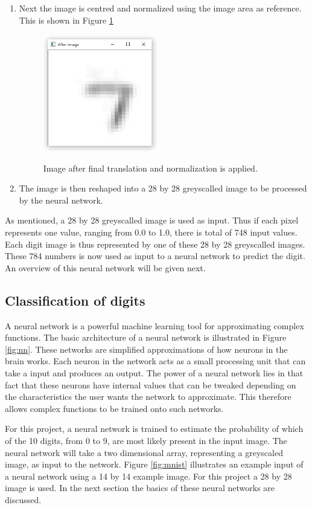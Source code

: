 \begin{enumerate}
\item Next the image is centred and normalized using the image area as reference.  This is shown in Figure \ref{fig:final}

\begin{figure}
  \centering
  \includegraphics[width=5cm]{TranslateAndScale}\\
  \caption{Image after final translation and normalization is applied.}
  \label{fig:final}
\end{figure}

\item The image is then reshaped into a 28 by 28 greyscalled image to be processed by the neural network.
\end{enumerate}
As mentioned, a 28 by 28 greyscalled image is used as input. Thus if each pixel represents one value, ranging from 0.0 to 1.0, there is total of 748 input values. Each digit image is thus represented by  one of these 28 by 28 greyscalled images. These 784 numbers is now used as input to a neural network to predict the digit. An overview of this neural network will be given next.

\subsection{Classification of digits}

A neural network is a powerful machine learning tool for approximating complex functions. The basic architecture of a neural network is illustrated in Figure \ref{fig:nn}. These networks are simplified approximations of how neurons in the brain works. Each neuron in the network acts as a small processing unit that can take a input and produces an output. The power of a neural network lies in that fact that these neurons have internal values that can be tweaked depending on the characteristics the user wants the network to approximate. This therefore allows complex functions to be trained onto such networks.

For this project, a neural network is trained to estimate the probability of which of the 10 digits, from 0 to 9, are most likely present in the input image. The neural network will take a two dimensional array, representing a greyscaled image, as input to the network. Figure \ref{fig:mnist} illustrates an example input of a neural network using a 14 by 14 example image. For this project a 28 by 28 image is used. In the next section the basics of these neural networks are discussed.

